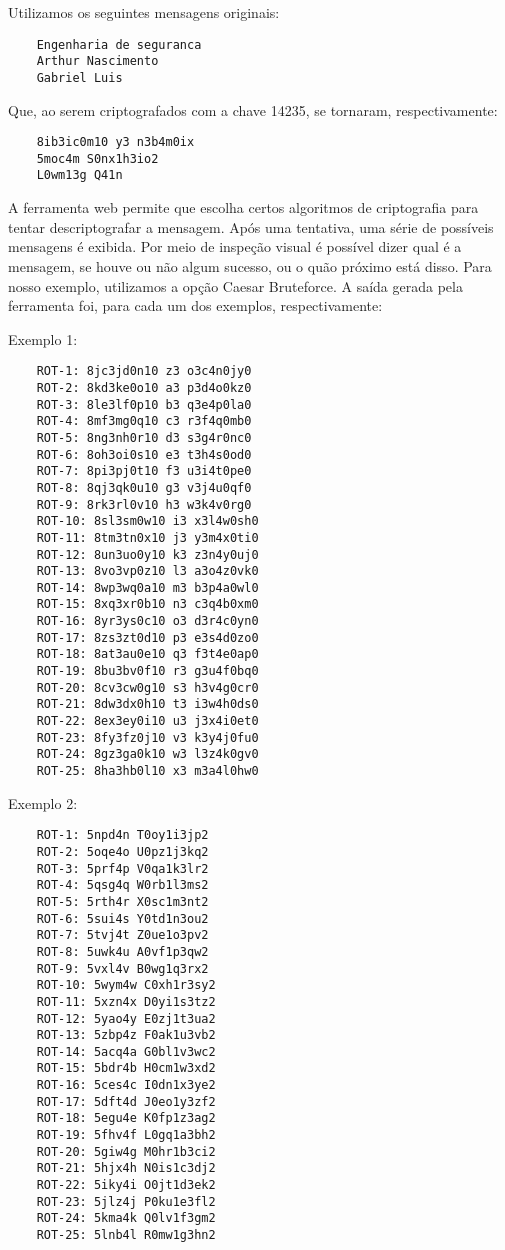 \documentclass[12pt]{article}
\begin{document}
Utilizamos os seguintes mensagens originais:

\begin{verbatim}
	Engenharia de seguranca
	Arthur Nascimento
	Gabriel Luis
\end{verbatim}

Que, ao serem criptografados com a chave 14235, se tornaram, respectivamente:

\begin{verbatim}
	8ib3ic0m10 y3 n3b4m0ix
	5moc4m S0nx1h3io2
	L0wm13g Q41n
\end{verbatim}

A ferramenta web permite que escolha certos algoritmos de criptografia para tentar descriptografar
a mensagem. Após uma tentativa, uma série de possíveis mensagens é exibida. Por meio de inspeção visual
é possível dizer qual é a mensagem, se houve ou não algum sucesso, ou o quão próximo está disso. Para
nosso exemplo, utilizamos a opção Caesar Bruteforce. A saída gerada pela ferramenta foi, para cada um
dos exemplos, respectivamente:

Exemplo 1:

\begin{verbatim}
	ROT-1: 8jc3jd0n10 z3 o3c4n0jy0
	ROT-2: 8kd3ke0o10 a3 p3d4o0kz0
	ROT-3: 8le3lf0p10 b3 q3e4p0la0
	ROT-4: 8mf3mg0q10 c3 r3f4q0mb0
	ROT-5: 8ng3nh0r10 d3 s3g4r0nc0
	ROT-6: 8oh3oi0s10 e3 t3h4s0od0
	ROT-7: 8pi3pj0t10 f3 u3i4t0pe0
	ROT-8: 8qj3qk0u10 g3 v3j4u0qf0
	ROT-9: 8rk3rl0v10 h3 w3k4v0rg0
	ROT-10: 8sl3sm0w10 i3 x3l4w0sh0
	ROT-11: 8tm3tn0x10 j3 y3m4x0ti0
	ROT-12: 8un3uo0y10 k3 z3n4y0uj0
	ROT-13: 8vo3vp0z10 l3 a3o4z0vk0
	ROT-14: 8wp3wq0a10 m3 b3p4a0wl0
	ROT-15: 8xq3xr0b10 n3 c3q4b0xm0
	ROT-16: 8yr3ys0c10 o3 d3r4c0yn0
	ROT-17: 8zs3zt0d10 p3 e3s4d0zo0
	ROT-18: 8at3au0e10 q3 f3t4e0ap0
	ROT-19: 8bu3bv0f10 r3 g3u4f0bq0
	ROT-20: 8cv3cw0g10 s3 h3v4g0cr0
	ROT-21: 8dw3dx0h10 t3 i3w4h0ds0
	ROT-22: 8ex3ey0i10 u3 j3x4i0et0
	ROT-23: 8fy3fz0j10 v3 k3y4j0fu0
	ROT-24: 8gz3ga0k10 w3 l3z4k0gv0
	ROT-25: 8ha3hb0l10 x3 m3a4l0hw0
\end{verbatim}

Exemplo 2:

\begin{verbatim}
	ROT-1: 5npd4n T0oy1i3jp2
	ROT-2: 5oqe4o U0pz1j3kq2
	ROT-3: 5prf4p V0qa1k3lr2
	ROT-4: 5qsg4q W0rb1l3ms2
	ROT-5: 5rth4r X0sc1m3nt2
	ROT-6: 5sui4s Y0td1n3ou2
	ROT-7: 5tvj4t Z0ue1o3pv2
	ROT-8: 5uwk4u A0vf1p3qw2
	ROT-9: 5vxl4v B0wg1q3rx2
	ROT-10: 5wym4w C0xh1r3sy2
	ROT-11: 5xzn4x D0yi1s3tz2
	ROT-12: 5yao4y E0zj1t3ua2
	ROT-13: 5zbp4z F0ak1u3vb2
	ROT-14: 5acq4a G0bl1v3wc2
	ROT-15: 5bdr4b H0cm1w3xd2
	ROT-16: 5ces4c I0dn1x3ye2
	ROT-17: 5dft4d J0eo1y3zf2
	ROT-18: 5egu4e K0fp1z3ag2
	ROT-19: 5fhv4f L0gq1a3bh2
	ROT-20: 5giw4g M0hr1b3ci2
	ROT-21: 5hjx4h N0is1c3dj2
	ROT-22: 5iky4i O0jt1d3ek2
	ROT-23: 5jlz4j P0ku1e3fl2
	ROT-24: 5kma4k Q0lv1f3gm2
	ROT-25: 5lnb4l R0mw1g3hn2
\end{verbatim}
\end{document}
